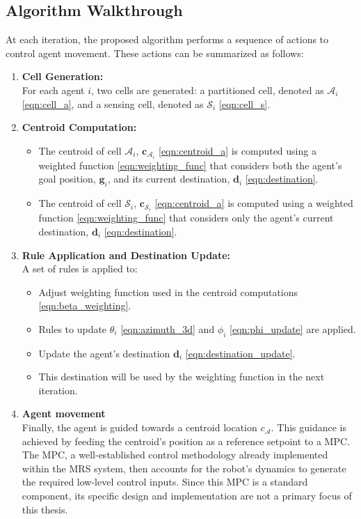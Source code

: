     \subsection{Algorithm Walkthrough}
        At each iteration, the proposed algorithm performs a sequence of actions to control agent movement. 
        These actions can be summarized as follows:
        \begin{enumerate}
            \item \textbf{Cell Generation:} \\
                For each agent $i$, two cells are generated: a partitioned cell, denoted as $\mathcal{A}_i$ \eqref{eqn:cell_a}, and a sensing cell, denoted as $\mathcal{S}_i$ \eqref{eqn:cell_s}.
            \item \textbf{Centroid Computation:}
                \begin{itemize}
                    \item The centroid of cell $\mathcal{A}_i$, $\mathbf{c}_{\mathcal{A}_i}$ \eqref{eqn:centroid_a} is computed using a weighted function \eqref{eqn:weighting_func} that considers both the agent's goal position, $\mathbf{g}_i$, and its current destination, $\mathbf{d}_i$ \eqref{eqn:destination}.
                    \item The centroid of cell $\mathcal{S}_i$, $\mathbf{c}_{\mathcal{S}_i}$ \eqref{eqn:centroid_a} is computed using a weighted function \eqref{eqn:weighting_func} that considers only the agent's current destination, $\mathbf{d}_i$ \eqref{eqn:destination}.
                \end{itemize}
            \item \textbf{Rule Application and Destination Update:} \\
                A set of rules is applied to: 
                \begin{itemize}
                    \item Adjust weighting function used in the centroid computations \eqref{eqn:beta_weighting}.
                    \item Rules to update $\theta_i$ \eqref{eqn:azimuth_3d} and $\phi_i$ \eqref{eqn:phi_update} are applied.
                    \item Update the agent's destination $\mathbf{d}_i$ \eqref{eqn:destination_update}.
                    \item This destination will be used by the weighting function in the next iteration.
                \end{itemize}
            \item \textbf{Agent movement} \\
                Finally, the agent is guided towards a centroid location $c_{\mathcal{A}}$.
                This guidance is achieved by feeding the centroid's position as a reference setpoint to a \ac{MPC}. 
                The \ac{MPC}, a well-established control methodology already implemented within the \ac{MRS} system, then accounts for the robot's dynamics to generate the required low-level control inputs. 
                Since this \ac{MPC} is a standard component, its specific design and implementation are not a primary focus of this thesis.
        \end{enumerate}
